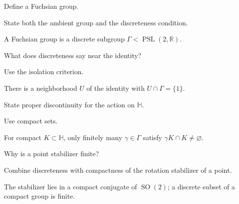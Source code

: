 \begin{exercise}\label{exr:vii35-01}
Define a Fuchsian group.
\end{exercise}

\begin{hint}
State both the ambient group and the discreteness condition.
\end{hint}

\begin{solution}
A Fuchsian group is a discrete subgroup \(\Gamma<\operatorname{PSL}(2,\mathbb R)\).
\end{solution}

\begin{exercise}\label{exr:vii35-02}
What does discreteness say near the identity?
\end{exercise}

\begin{hint}
Use the isolation criterion.
\end{hint}

\begin{solution}
There is a neighborhood \(U\) of the identity with \(U\cap\Gamma=\{1\}\).
\end{solution}

\begin{exercise}\label{exr:vii35-03}
State proper discontinuity for the action on \(\mathbb H\).
\end{exercise}

\begin{hint}
Use compact sets.
\end{hint}

\begin{solution}
For compact \(K\subset\mathbb H\), only finitely many \(\gamma\in\Gamma\) satisfy \(\gamma K\cap K\ne\varnothing\).
\end{solution}

\begin{exercise}\label{exr:vii35-04}
Why is a point stabilizer finite?
\end{exercise}

\begin{hint}
Combine discreteness with compactness of the rotation stabilizer of a point.
\end{hint}

\begin{solution}
The stabilizer lies in a compact conjugate of \(\operatorname{SO}(2)\); a discrete subset of a compact group is finite.
\end{solution}


